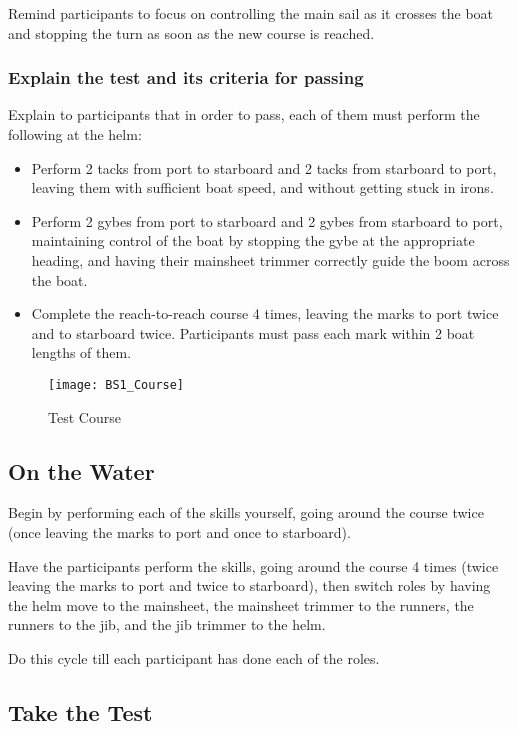 \documentclass[12pt]{scrartcl}
\begin{document}
Remind participants to focus on controlling the main sail as it crosses the boat and stopping the turn as soon as the new course is reached.

\subsubsection{Explain the test and its criteria for passing} \label{subsubsec:test}

Explain to participants that in order to pass, each of them must perform the following at the helm:

\begin{itemize}
		\item Perform 2 tacks from port to starboard and 2 tacks from starboard to port, leaving them with sufficient boat speed, and without getting stuck in irons.
		\item Perform 2 gybes from port to starboard and 2 gybes from starboard to port, maintaining control of the boat by stopping the gybe at the appropriate heading, and having their mainsheet trimmer correctly guide the boom across the boat.
		\item Complete the reach-to-reach course 4 times, leaving the marks to port twice and to starboard twice. Participants must pass each mark within 2 boat lengths of them.
\end{itemize}

\label{fig:test course}
\begin{figure}[H]
	\centering
	\texttt{[image: BS1\_Course]}
	\caption{Test Course}
\end{figure}

\subsection{On the Water} \label{subsec:on the water}

Begin by performing each of the skills yourself, going around the course twice (once leaving the marks to port and once to starboard).

Have the participants perform the skills, going around the course 4 times (twice leaving the marks to port and twice to starboard), then switch roles by having the helm move to the mainsheet, the mainsheet trimmer to the runners, the runners to the jib, and the jib trimmer to the helm.

Do this cycle till each participant has done each of the roles.

\subsection{Take the Test} \label{subsec:take the test}
\end{document}
